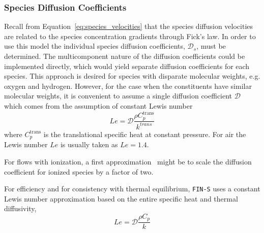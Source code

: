 \subsubsection{Species Diffusion Coefficients}
Recall from Equation~\eqref{eq:species_velocities} that the species
diffusion velocities are related to the species concentration
gradients through Fick's law.  In order to use this model the
individual species diffusion coefficients, $\mathcal{D}_s$, must be
determined.  The multicomponent nature of the diffusion coefficients
could be implemented directly, which would yield separate diffusion
coefficients for each species.  This approach is desired for species
with disparate molecular weights, e.g.  oxygen and hydrogen.  However,
for the case when the constituents have similar molecular weights, it
is convenient to assume a single diffusion coefficient $\mathcal{D}$
which comes from the assumption of constant Lewis number
\begin{equation}
  \label{eq:lewis}
  Le = \mathcal{D}\frac{\rho C^{\text{trans}}_p}{k^{trans}}
\end{equation}
where $C^{\text{trans}}_p$ is the translational specific heat
at constant pressure.  For air the Lewis number $Le$ is usually taken
as $Le=1.4$.

For flows with ionization, a first approximation~\cite{Candler2010}
might be to scale the diffusion coefficient for ionized species by a
factor of two.

For efficiency and for consistency with thermal equilibrium,
\texttt{FIN-S} uses a constant Lewis number approximation based on the
entire specific heat and thermal diffusivity,
\begin{equation}
  \label{eq:lewis_equilibrium}
  Le = \mathcal{D}\frac{\rho C_p}{k}
\end{equation}

